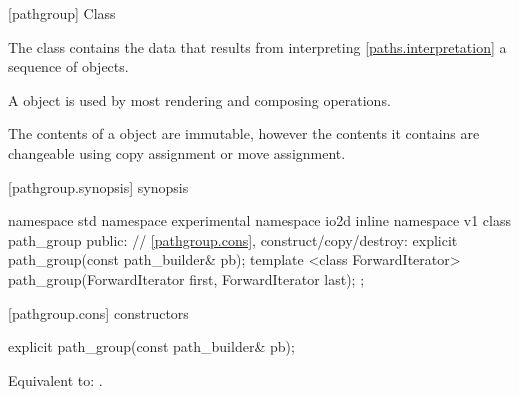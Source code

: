  [pathgroup] {Class }

\pnum
{}
The class  contains the data that results from interpreting \ref{paths.interpretation} a sequence of  objects. %

\pnum
A  object is used by most rendering and composing operations.

\pnum
The contents of a  object are immutable, however the contents it contains are changeable using copy assignment or move assignment.

%

%
 [pathgroup.synopsis] { synopsis}

\begin{codeblock}
namespace std { namespace experimental { namespace io2d { inline namespace v1 {
  class path_group {
    public:
    // \ref{pathgroup.cons}, construct/copy/destroy:
    explicit path_group(const path_builder& pb);
    template <class ForwardIterator>
    path_group(ForwardIterator first, ForwardIterator last);
  };
} } } }
\end{codeblock}

 [pathgroup.cons] { constructors}

\begin{itemdecl}
    explicit path_group(const path_builder& pb);
\end{itemdecl}
\begin{itemdescr}
\pnum
\effects
Equivalent to: .	
\end{itemdescr}

